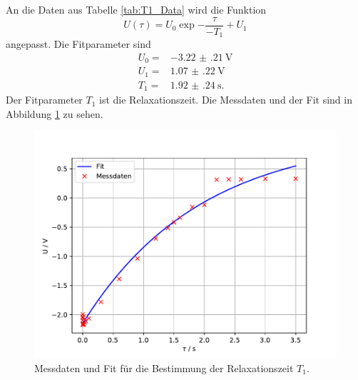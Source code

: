 An die Daten aus Tabelle \ref{tab:T1_Data} wird die Funktion 
\begin{equation}
  \label{eq:Fit_Funktion_T1T2}
  U(\tau)= U_{\text{0}} \exp{-\frac{\tau}{-T_{\text{1}}}} + U_{\text{1}}
\end{equation}
angepasst.
Die Fitparameter sind
\begin{align*}
  U_{\text{0}} =& \SI{-3.22(21)}{\volt}\\
  U_{\text{1}} =& \SI{1.07(22)}{\volt}\\
  T_{\text{1}} =& \SI{1.92(24)}{\second}.
\end{align*}
Der Fitparameter $T_{\text{1}}$ ist die Relaxationszeit.
Die Messdaten und der Fit sind in Abbildung \ref{fig:T1_Data_fit} zu sehen.
\begin{figure}
  \centering
  \includegraphics[width = \textwidth, keepaspectratio]{figure/T1_fit.pdf}
  \caption{Messdaten und Fit für die Bestimmung der Relaxationszeit $T_{\text{1}}$.}
  \label{fig:T1_Data_fit}
\end{figure}
\FloatBarrier
